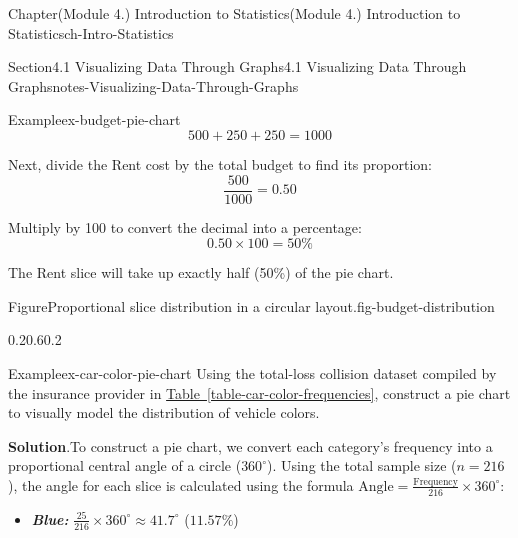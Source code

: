 \documentclass[oneside,10pt,]{book}
\newcommand{\blocktitlefont}{\relax}
\newcommand{\xreffont}{\relax}
\newcommand{\ptxlistdisc}{\raisebox{0.3ex}{\textbullet}}
\newcommand{\alert}[1]{\textbf{\textit{#1}}}
\begin{document}
\begin{chapterptx}{Chapter}{(Module 4.) Introduction to Statistics}{}{(Module 4.) Introduction to Statistics}{}{}{ch-Intro-Statistics}
\begin{sectionptx}{Section}{4.1 Visualizing Data Through Graphs}{}{4.1 Visualizing Data Through Graphs}{}{}{notes-Visualizing-Data-Through-Graphs}
\begin{example}{Example}{}{ex-budget-pie-chart}
\begin{equation*}
500 + 250 + 250 = 1000
\end{equation*}
%
\par
Next, divide the Rent cost by the total budget to find its proportion:%
\begin{equation*}
\frac{500}{1000} = 0.50
\end{equation*}
%
\par
Multiply by 100 to convert the decimal into a percentage:%
\begin{equation*}
0.50 \times 100 = 50\%
\end{equation*}
%
\par
The Rent slice will take up exactly half (50\%) of the pie chart.%
\begin{figureptx}{Figure}{Proportional slice distribution in a circular layout.}{fig-budget-distribution}{}%
\begin{image}{0.2}{0.6}{0.2}{}%
%
\end{image}%
\tcblower
\end{figureptx}%
\end{example}
\begin{example}{Example}{}{ex-car-color-pie-chart}%
Using the total-loss collision dataset compiled by the insurance provider in \hyperref[table-car-color-frequencies]{Table~{\xreffont\ref{table-car-color-frequencies}}}, construct a pie chart to visually model the distribution of vehicle colors.%
\par\smallskip%
\noindent\textbf{\blocktitlefont Solution}.\hypertarget{ex-car-color-pie-chart-2}{}\quad{}To construct a pie chart, we convert each category's frequency into a proportional central angle of a circle (\(360^{\circ}\)). Using the total sample size (\(n = 216\)), the angle for each slice is calculated using the formula \(\text{Angle} = \frac{\text{Frequency}}{216} \times 360^{\circ}\):%
\par
%
\begin{itemize}[label=\ptxlistdisc]
\item{}\alert{Blue:} \(\frac{25}{216} \times 360^{\circ} \approx 41.7^{\circ}\) (\(11.57\%\))%

\end{itemize}
\end{example}
\end{sectionptx}
\end{chapterptx}
\end{document}
